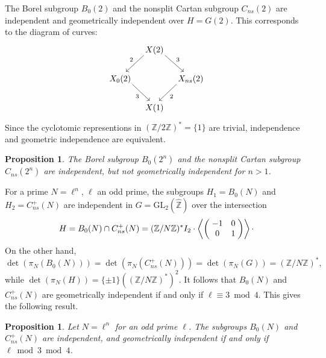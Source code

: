 \documentclass{amsart}
\newcommand{\ZZ}{\mathbb{Z}}
\newcommand{\ZZhat}{\widehat{\ZZ}}
\newcommand{\GL}{\mathrm{GL}}
\newtheorem{proposition}[theorem]{Proposition}
\begin{document}
  The Borel subgroup $B_0(2)$ and the nonsplit Cartan subgroup $C_{ns}(2)$
  are independent and geometrically independent over $H = G(2)$.
  This corresponds to the diagram of curves:
  $$
  \begin{tikzcd}[column sep=3mm,row sep=6mm]
    & X(2)
    \arrow[dl,"2",swap,start anchor={[xshift=+1mm,yshift=+1mm]south west}, end anchor={[xshift=+2.5mm]north}]
    \arrow[dr,"3",start anchor={[xshift=-1mm,yshift=+1mm]south east}, end anchor={[xshift=-3mm]north}] \\
    X_0(2)
    \arrow[dr,"3",swap,start anchor={[xshift=-1mm,yshift=+1mm]south east}, end anchor={[xshift=-2mm]north}]    & & X_{ns}(2)
    \arrow[dl,"2",start anchor={[xshift=+1mm,yshift=+1mm]south west}, end anchor={[xshift=+2mm]north}] \\
    & X(1)
  \end{tikzcd}
  $$
  Since the cyclotomic representions in $(\ZZ/2\ZZ)^* = \{1\}$ are trivial, independence
  and geometric independence are equivalent.

\begin{proposition}
  The Borel subgroup $B_0(2^n)$ and the nonsplit Cartan subgroup
  $C_{ns}(2^n)$ are independent, but not geometrically independent
  for $n > 1$.
\end{proposition}


For a prime $N = \ell^n$, $\ell$ an odd prime, the subgroups
$H_1 = B_0(N)$ and $H_2 = C_{ns}^+(N)$ are independent in
$G = \GL_2(\ZZhat)$ over the intersection
$$
H = B_0(N) \cap C_{ns}^+(N) =
    (\ZZ/N\ZZ)^*I_2
    \cdot
    \left\langle
    \left(\begin{array}{@{\;}cc@{\;}}
      -1 & 0 \\ 0 & 1
    \end{array}\right)
    \right\rangle
    \cdot
  $$
  On the other hand, 
  $$
  \det(\pi_N(B_0(N))) = \det(\pi_N(C_{ns}^+(N))) = \det(\pi_N(G)) = (\ZZ/N\ZZ)^*,
  $$
  while $\det(\pi_N(H)) = \{\pm1\}((\ZZ/N\ZZ)^*)^2$.  It follows that
  $B_0(N)$ and $C_{ns}^+(N)$ are geometrically independent if
  and only if $\ell \equiv 3 \bmod 4$.
  This gives the following result.

\begin{proposition}
  Let $N = \ell^n$ for an odd prime $\ell$.
  The subgroups $B_0(N)$ and $C_{ns}^+(N)$ are independent, and
  geometrically independent if and only if $\ell \bmod 3 \bmod 4$.
\end{proposition}
\end{document}
